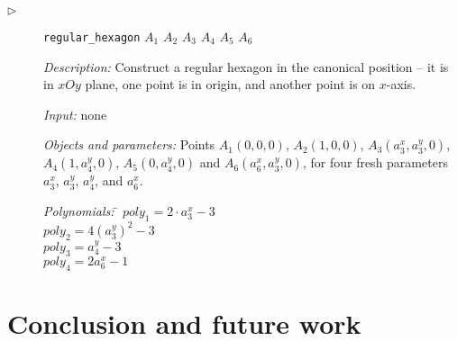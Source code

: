\documentclass{aicom2e}
\begin{document}
\begin{description}
\item[$\triangleright$] {\tt regular\_hexagon} $A_1$ $A_2$ $A_3$ $A_4$ $A_5$ $A_6$

  {\em Description:} Construct a regular hexagon in the canonical
  position -- it is in $xOy$ plane, one point is in origin, and
  another point is on $x$-axis. 
  
  {\em Input:} none

  {\em Objects and parameters:} Points $A_1(0, 0, 0)$, $A_2(1, 0, 0)$,
  $A_3(a_3^x, a_3^y, 0)$, $A_4(1, a_4^y, 0)$, $A_5(0, a_4^y, 0)$ and
  $A_6(a_6^x, a_3^y, 0)$, for four fresh parameters $a_3^x$, $a_3^y$,
  $a_4^y$, and $a_6^x$.

\begin{tabbing}
{\em Polynomials:} \= $poly_1 = 2\cdot a_3^x - 3$ \\
                   \> $poly_2 = 4(a_3^y)^2 - 3$ \\
                   \> $poly_3 = a_4^y - 3$ \\
                   \> $poly_4 = 2a_6^x - 1$
\end{tabbing}

\end{description}
\section{Conclusion and future work}
\end{document}
